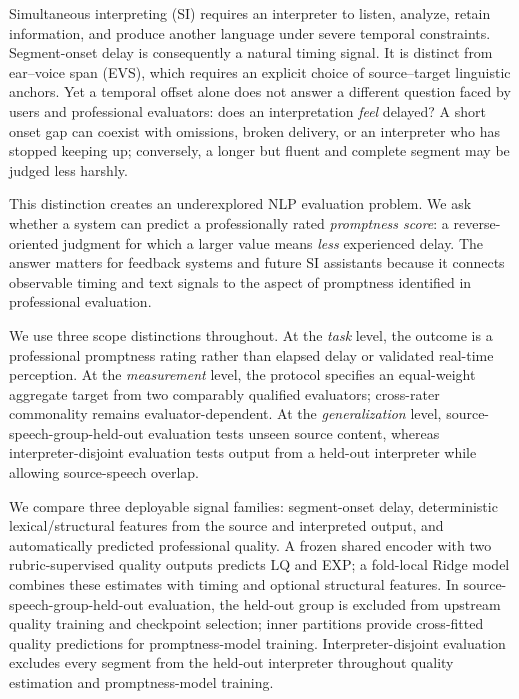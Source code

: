 Simultaneous interpreting (SI) requires an interpreter to listen, analyze, retain information, and produce another language under severe temporal constraints. Segment-onset delay is consequently a natural timing signal. It is distinct from ear--voice span (EVS), which requires an explicit choice of source--target linguistic anchors. Yet a temporal offset alone does not answer a different question faced by users and professional evaluators: does an interpretation \emph{feel} delayed? A short onset gap can coexist with omissions, broken delivery, or an interpreter who has stopped keeping up; conversely, a longer but fluent and complete segment may be judged less harshly.

This distinction creates an underexplored NLP evaluation problem. We ask whether a system can predict a professionally rated \emph{promptness score}: a reverse-oriented judgment for which a larger value means \emph{less} experienced delay. The answer matters for feedback systems and future SI assistants because it connects observable timing and text signals to the aspect of promptness identified in professional evaluation.

We use three scope distinctions throughout. At the \emph{task} level, the outcome is a professional promptness rating rather than elapsed delay or validated real-time perception. At the \emph{measurement} level, the protocol specifies an equal-weight aggregate target from two comparably qualified evaluators; cross-rater commonality remains evaluator-dependent. At the \emph{generalization} level, source-speech-group-held-out evaluation tests unseen source content, whereas interpreter-disjoint evaluation tests output from a held-out interpreter while allowing source-speech overlap.

We compare three deployable signal families: segment-onset delay, deterministic lexical/structural features from the source and interpreted output, and automatically predicted professional quality. A frozen shared encoder with two rubric-supervised quality outputs predicts LQ and EXP; a fold-local Ridge model combines these estimates with timing and optional structural features. In source-speech-group-held-out evaluation, the held-out group is excluded from upstream quality training and checkpoint selection; inner partitions provide cross-fitted quality predictions for promptness-model training. Interpreter-disjoint evaluation excludes every segment from the held-out interpreter throughout quality estimation and promptness-model training.


